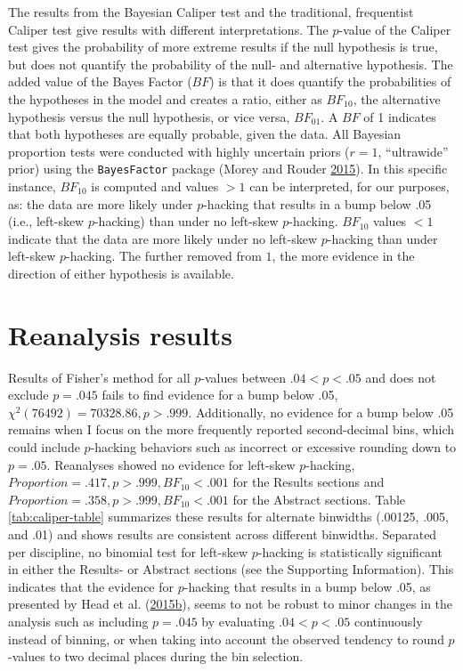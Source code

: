 \documentclass[a5paper]{book}
\begin{document}
The results from the Bayesian Caliper test and the traditional,
frequentist Caliper test give results with different interpretations.
The \(p\)-value of the Caliper test gives the probability of more
extreme results if the null hypothesis is true, but does not quantify
the probability of the null- and alternative hypothesis. The added value
of the Bayes Factor (\(BF\)) is that it does quantify the probabilities
of the hypotheses in the model and creates a ratio, either as
\(BF_{10}\), the alternative hypothesis versus the null hypothesis, or
vice versa, \(BF_{01}\). A \(BF\) of 1 indicates that both hypotheses
are equally probable, given the data. All Bayesian proportion tests were
conducted with highly uncertain priors (\(r=1\), \enquote{ultrawide}
prior) using the \texttt{BayesFactor} package (Morey and Rouder
\protect\hyperlink{ref-bf}{2015}). In this specific instance,
\(BF_{10}\) is computed and values \(>1\) can be interpreted, for our
purposes, as: the data are more likely under \(p\)-hacking that results
in a bump below .05 (i.e., left-skew \(p\)-hacking) than under no
left-skew \(p\)-hacking. \(BF_{10}\) values \(<1\) indicate that the
data are more likely under no left-skew \(p\)-hacking than under
left-skew \(p\)-hacking. The further removed from \(1\), the more
evidence in the direction of either hypothesis is available.

\section{Reanalysis results}\label{reanalysis-results}

Results of Fisher's method for all \(p\)-values between \(.04<p<.05\)
and does not exclude \(p=.045\) fails to find evidence for a bump below
.05, \(\chi^2(76492)=70328.86,p>.999\). Additionally, no evidence for a
bump below .05 remains when I focus on the more frequently reported
second-decimal bins, which could include \(p\)-hacking behaviors such as
incorrect or excessive rounding down to \(p=.05\). Reanalyses showed no
evidence for left-skew \(p\)-hacking,
\(Proportion=.417,p>.999, BF_{10}<.001\) for the Results sections and
\(Proportion=.358,p>.999,BF_{10}<.001\) for the Abstract sections. Table
\ref{tab:caliper-table} summarizes these results for alternate binwidths
(.00125, .005, and .01) and shows results are consistent across
different binwidths. Separated per discipline, no binomial test for
left-skew \(p\)-hacking is statistically significant in either the
Results- or Abstract sections (see the Supporting Information). This
indicates that the evidence for \(p\)-hacking that results in a bump
below .05, as presented by Head et al.
(\protect\hyperlink{ref-doi:10.1371ux2fjournal.pbio.1002106}{2015}\protect\hyperlink{ref-doi:10.1371ux2fjournal.pbio.1002106}{b}),
seems to not be robust to minor changes in the analysis such as
including \(p=.045\) by evaluating \(.04<p<.05\) continuously instead of
binning, or when taking into account the observed tendency to round
\(p\)-values to two decimal places during the bin selection.
\end{document}

